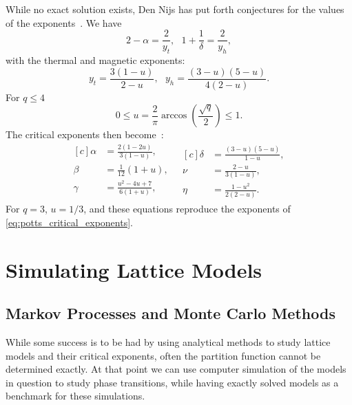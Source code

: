 \documentclass[11pt, a4paper]{report} %
\begin{document}
While no exact solution exists, Den Nijs has put forth conjectures for the values of the exponents~\cite{nijs:1979}.
We have~\cite{wu:1982}
\begin{equation}
	2 - \alpha = \frac{2}{y_t} ,\ \ \ 1 + \frac{1}{\delta} = \frac{2}{y_h},
\end{equation}
with the thermal and magnetic exponents:
\begin{equation}
	y_t = \frac{3(1-u)}{2-u},\ \ \ y_h = \frac{(3-u)(5-u)}{4(2-u)}.
\end{equation}
For \(q \leq 4\)~\cite{wu:1982}
\begin{equation}
	0 \leq u = \frac{2}{\pi} \arccos(\frac{\sqrt{q}}{2}) \leq 1.
\end{equation}
The critical exponents then become~\cite{wu:1982, baxter:1989}:
\begin{equation}
	\begin{aligned}[c]
		\alpha &= \frac{2(1-2u)}{3(1-u)}, \\
		\beta &= \frac{1}{12}(1 + u), \\
		\gamma &= \frac{u^2 -4u +7}{6(1+u)}, \\
	\end{aligned}
	\ \ \
	\begin{aligned}[c]
		\delta &= \frac{(3-u)(5-u)}{1-u}, \\
		\nu &= \frac{2-u}{3(1-u)}, \\
		\eta &= \frac{1-u^2}{2(2-u)}.
	\end{aligned}
\end{equation}
For \(q=3\), \(u=1/3\), and these equations reproduce the exponents of \cref{eq:potts_critical_exponents}.


\chapter{Simulating Lattice Models}

\section{Markov Processes and Monte Carlo Methods}
While some success is to be had by using analytical methods to study lattice models and their critical exponents, often the partition function cannot be determined exactly.
At that point we can use computer simulation of the models in question to study phase transitions, while having exactly solved models as a benchmark for these simulations.
\end{document}
